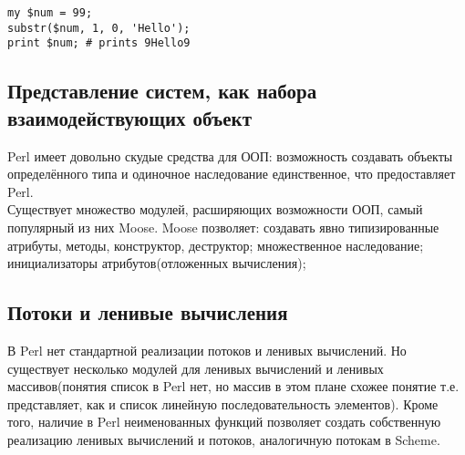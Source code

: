 \documentclass[11pt,a4paper]{article}
\begin{document}
\begin{lstlisting} 
my $num = 99;
substr($num, 1, 0, 'Hello');
print $num; # prints 9Hello9   
\end{lstlisting} 

\subsection*{Представление систем, как набора взаимодействующих объект}
Perl имеет довольно скудые средства для ООП: возможность создавать
объекты определённого типа и одиночное наследование единственное, что
предоставляет Perl. \\
Существует множество модулей, расширяющих возможности ООП, самый
популярный из них Moose. Moose позволяет: создавать явно типизированные
атрибуты, методы,
конструктор, деструктор; множественное наследование; инициализаторы
атрибутов(отложенных вычисления);

\subsection*{Потоки и ленивые вычисления}
В Perl нет стандартной реализации потоков и ленивых вычислений. Но
существует несколько модулей для ленивых вычислений и ленивых
массивов(понятия список в Perl нет, но массив в этом плане схожее
понятие т.е. представляет, как и 
список линейную последовательность элементов). Кроме того, наличие в
Perl неименованных функций позволяет создать собственную реализацию
ленивых вычислений и потоков, аналогичную потокам в Scheme.
\end{document}
